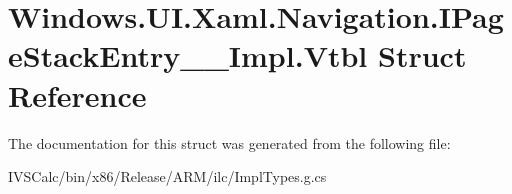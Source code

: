 \hypertarget{struct_windows_1_1_u_i_1_1_xaml_1_1_navigation_1_1_i_page_stack_entry_____impl_1_1_vtbl}{}\section{Windows.\+U\+I.\+Xaml.\+Navigation.\+I\+Page\+Stack\+Entry\+\_\+\+\_\+\+Impl.\+Vtbl Struct Reference}
\label{struct_windows_1_1_u_i_1_1_xaml_1_1_navigation_1_1_i_page_stack_entry_____impl_1_1_vtbl}


The documentation for this struct was generated from the following file\+:\begin{DoxyCompactItemize}
\item 
I\+V\+S\+Calc/bin/x86/\+Release/\+A\+R\+M/ilc/Impl\+Types.\+g.\+cs\end{DoxyCompactItemize}

